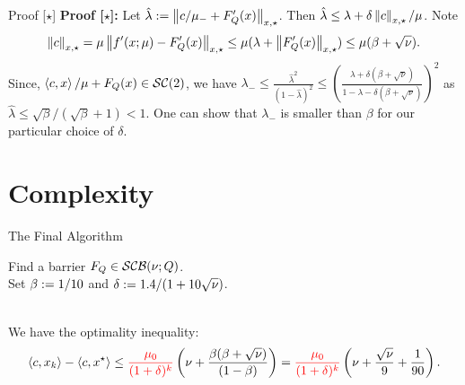 \documentclass[9pt]{beamer}
\begin{document}
\begin{frame}{Proof [$\star$]}
  \textbf{Proof [$\star$]:} Let $\hat \lambda := \left\|c/\mu_{-} + F'_Q(x)\right\|_{x, \star}$. Then $\hat \lambda \leq \lambda + \delta \left\|c\right\|_{x, \star}/\mu$. Note
  \[
    \left\|c\right\|_{x,\star}= \mu \left\| f'(x; \mu)-F'_Q(x)\right\|_{x, \star} \leq \mu(\lambda +\left\|F_Q'(x)\right\|_{x,\star}) \leq \mu(\beta + \sqrt{\nu}).
  \]
  Since, $\left<c, x\right>/\mu + F_Q(x) \in \mathcal{SC}(2)$, we have $\lambda_{-} \leq \frac{\hat \lambda^2}{(1-\hat \lambda)^2} \leq \left(\frac{\lambda+\delta(\beta + \sqrt{\nu})}{1-\lambda -\delta(\beta+\sqrt{\nu}) }\right)^2$ as $\hat \lambda \leq \sqrt{\beta}/(\sqrt\beta+1)<1$. One can show that $\lambda_-$ is smaller than $\beta$ for our particular choice of $\delta$.

  
\end{frame}

\section{Complexity}

\begin{frame}{The Final Algorithm}

    \begin{algorithm}[H]
      Find a barrier $F_Q\in \mathcal{SCB}(\nu; Q)$.\\
      Set $\beta:= {1}/{10}$ and $\delta := {1.4}/{(1+10\sqrt{\nu})}$.\\
      \\
    \caption{Self-Concordant Barrier Method}
  \end{algorithm}

  \vfill
  We have the optimality inequality:
  \[
    \left<c, x_k\right> - \left<c, x^\star\right> \leq {\color{red} \frac{\mu_0}{(1+\delta)^k}}\left(\nu+\frac{\beta(\beta +\sqrt{\nu})}{(1-\beta)}\right) = {\color{red} \frac{\mu_0}{(1+\delta)^k}}\left(\nu+\frac{\sqrt{\nu}}{9} + \frac{1}{90}\right).
  \]

  
\end{frame}
\end{document}
